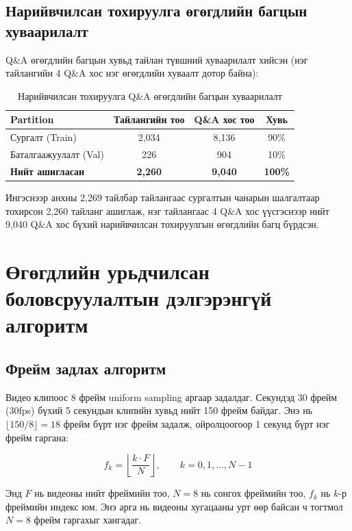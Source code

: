 \subsection{Нарийвчилсан тохируулга өгөгдлийн багцын хуваарилалт}

Q\&A өгөгдлийн багцын хувьд тайлан түвшний хуваарилалт хийсэн (нэг тайлангийн 4 Q\&A хос нэг өгөгдлийн хуваалт дотор байна):

\begin{table}[htbp]
\centering
\caption{Нарийвчилсан тохируулга Q\&A өгөгдлийн багцын хуваарилалт}
\label{tab:qa_split}
\begin{tabular}{lccc}
\hline
\textbf{Partition} & \textbf{Тайлангийн тоо} & \textbf{Q\&A хос тоо} & \textbf{Хувь} \\
\hline
Сургалт (Train)       & 2,034 & 8,136 & 90\% \\
Баталгаажуулалт (Val) & 226   & 904   & 10\% \\
\textbf{Нийт ашигласан} & \textbf{2,260} & \textbf{9,040} & \textbf{100\%} \\
\hline
\hline
\end{tabular}
\end{table}

Ингэснээр анхны 2,269 тайлбар тайлангаас сургалтын чанарын шалгалтаар тохирсон 2,260 тайланг ашиглаж, нэг тайлангаас 4 Q\&A хос үүсгэснээр нийт 9,040 Q\&A хос бүхий нарийвчилсан тохируулгын өгөгдлийн багц бүрдсэн.

\section{Өгөгдлийн урьдчилсан боловсруулалтын дэлгэрэнгүй алгоритм}

\subsection{Фрейм задлах алгоритм}

Видео клипоос 8 фрейм uniform sampling аргаар задалдаг. Секундэд 30 фрейм (30fps) бүхий 5 секундын клипийн хувьд нийт 150 фрейм байдаг. Энэ нь $\lfloor 150 / 8 \rfloor = 18$ фрейм бүрт нэг фрейм задалж, ойролцоогоор 1 секунд бүрт нэг фрейм гаргана:

\begin{equation}
    f_k = \left\lfloor \frac{k \cdot F}{N} \right\rfloor, \qquad k = 0, 1, \ldots, N-1
\end{equation}

Энд $F$ нь видеоны нийт фреймийн тоо, $N = 8$ нь сонгох фреймийн тоо, $f_k$ нь $k$-р фреймийн индекс юм. Энэ арга нь видеоны хугацааны урт өөр байсан ч тогтмол $N=8$ фрейм гаргахыг хангадаг.

